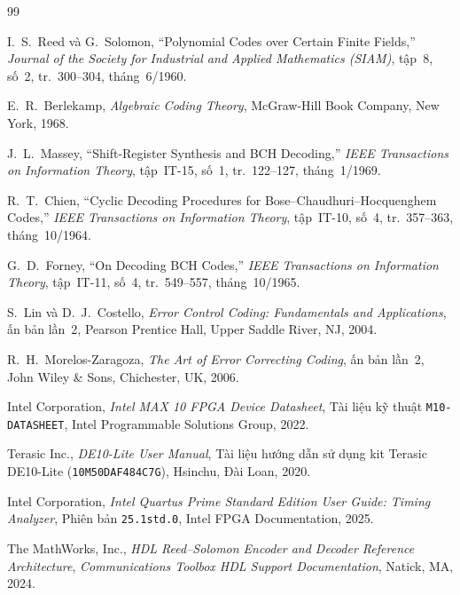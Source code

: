 \begin{thebibliography}{99}

I.~S.~Reed và G.~Solomon, ``Polynomial Codes over Certain Finite Fields,'' \textit{Journal of the Society for Industrial and Applied Mathematics (SIAM)}, tập~8, số~2, tr.~300--304, tháng~6/1960.

E.~R.~Berlekamp, \textit{Algebraic Coding Theory}, McGraw-Hill Book Company, New York, 1968.

J.~L.~Massey, ``Shift-Register Synthesis and BCH Decoding,'' \textit{IEEE Transactions on Information Theory}, tập~IT-15, số~1, tr.~122--127, tháng~1/1969.

R.~T.~Chien, ``Cyclic Decoding Procedures for Bose--Chaudhuri--Hocquenghem Codes,'' \textit{IEEE Transactions on Information Theory}, tập~IT-10, số~4, tr.~357--363, tháng~10/1964.

G.~D.~Forney, ``On Decoding BCH Codes,'' \textit{IEEE Transactions on Information Theory}, tập~IT-11, số~4, tr.~549--557, tháng~10/1965.

S.~Lin và D.~J.~Costello, \textit{Error Control Coding: Fundamentals and Applications}, ấn bản lần~2, Pearson Prentice Hall, Upper Saddle River, NJ, 2004.

R.~H.~Morelos-Zaragoza, \textit{The Art of Error Correcting Coding}, ấn bản lần~2, John Wiley \& Sons, Chichester, UK, 2006.

Intel Corporation, \textit{Intel MAX 10 FPGA Device Datasheet}, Tài liệu kỹ thuật \texttt{M10-DATASHEET}, Intel Programmable Solutions Group, 2022.

Terasic Inc., \textit{DE10-Lite User Manual}, Tài liệu hướng dẫn sử dụng kit Terasic DE10-Lite (\texttt{10M50DAF484C7G}), Hsinchu, Đài Loan, 2020.

Intel Corporation, \textit{Intel Quartus Prime Standard Edition User Guide: Timing Analyzer}, Phiên bản \texttt{25.1std.0}, Intel FPGA Documentation, 2025.

The MathWorks, Inc., \textit{HDL Reed--Solomon Encoder and Decoder Reference Architecture}, \textit{Communications Toolbox HDL Support Documentation}, Natick, MA, 2024.

\end{thebibliography}


